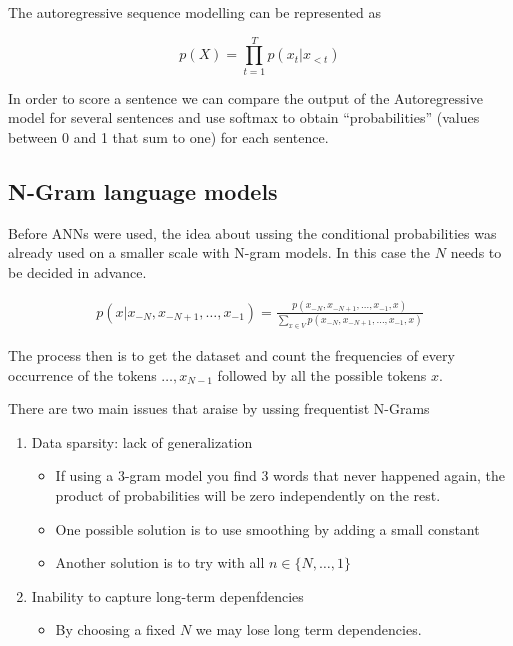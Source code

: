 The autoregressive sequence modelling can be represented as

\begin{equation}
  p(X) = \prod_{t=1}^T p(x_t|x_{<t})
\end{equation}

In order to score a sentence we can compare the output of the Autoregressive
model for several sentences and use softmax to obtain ``probabilities'' (values
between 0 and 1 that sum to one) for each sentence.

\subsection{N-Gram language models}

Before \glspl{ANN} were used, the idea about ussing the conditional probabilities was
already used on a smaller scale with N-gram models. In this case the $N$ needs
to be decided in advance.

\begin{align}
  p(x|x_{-N},x_{-N+1},\dots,x_{-1}) = \frac{p(x_{-N},x_{-N+1},\dots,x_{-1}, x)} {\sum_{x \in V}p(x_{-N},x_{-N+1},\dots,x_{-1}, x)}
\end{align}

The process then is to get the dataset and count the frequencies of every
occurrence of the tokens $\dots,x_{N-1}$ followed by all the possible tokens
$x$.

There are two main issues that araise by ussing frequentist N-Grams

\begin{enumerate}
  \item Data sparsity: lack of generalization
    \begin{itemize}
      \item If using a 3-gram model you find 3 words that never happened again,
        the product of probabilities will be zero independently on the rest.
      \item One possible solution is to use smoothing by adding a small
        constant
      \item Another solution is to try with all $n \in \{N,\dots,1\}$
    \end{itemize}
  \item Inability to capture long-term depenfdencies
\begin{itemize}
  \item By choosing a fixed $N$ we may lose long term dependencies.
\end{itemize}
\end{enumerate}

